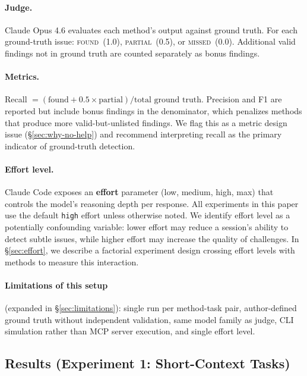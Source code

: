 \documentclass[11pt]{article}
\begin{document}
\paragraph{Judge.} Claude Opus 4.6 evaluates each method's output against ground truth. For each ground-truth issue: \textsc{found}~(1.0), \textsc{partial}~(0.5), or \textsc{missed}~(0.0). Additional valid findings not in ground truth are counted separately as bonus findings.

\paragraph{Metrics.} Recall $= (\text{found} + 0.5 \times \text{partial}) / \text{total ground truth}$. Precision and F1 are reported but include bonus findings in the denominator, which penalizes methods that produce more valid-but-unlisted findings. We flag this as a metric design issue (\S\ref{sec:why-no-help}) and recommend interpreting recall as the primary indicator of ground-truth detection.

\paragraph{Effort level.} Claude Code exposes an \textbf{effort} parameter (low, medium, high, max) that controls the model's reasoning depth per response. All experiments in this paper use the default \texttt{high} effort unless otherwise noted. We identify effort level as a potentially confounding variable: lower effort may reduce a session's ability to detect subtle issues, while higher effort may increase the quality of challenges. In \S\ref{sec:effort}, we describe a factorial experiment design crossing effort levels with methods to measure this interaction.

\paragraph{Limitations of this setup} (expanded in \S\ref{sec:limitations}): single run per method-task pair, author-defined ground truth without independent validation, same model family as judge, CLI simulation rather than MCP server execution, and single effort level.

\subsection{Results (Experiment 1: Short-Context Tasks)}
\label{sec:exp1-results}
\end{document}
